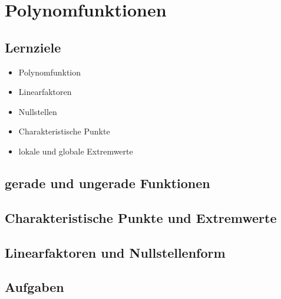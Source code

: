 
\section{Polynomfunktionen}

\subsection*{Lernziele}

\begin{itemize}
\item Polynomfunktion
\item Linearfaktoren
\item Nullstellen
\item Charakteristische Punkte
\item lokale und globale Extremwerte
\end{itemize}


\subsection{gerade und ungerade Funktionen}

\subsection{Charakteristische Punkte und Extremwerte}

\subsection{Linearfaktoren und Nullstellenform}


\subsection*{Aufgaben}



\newpage

